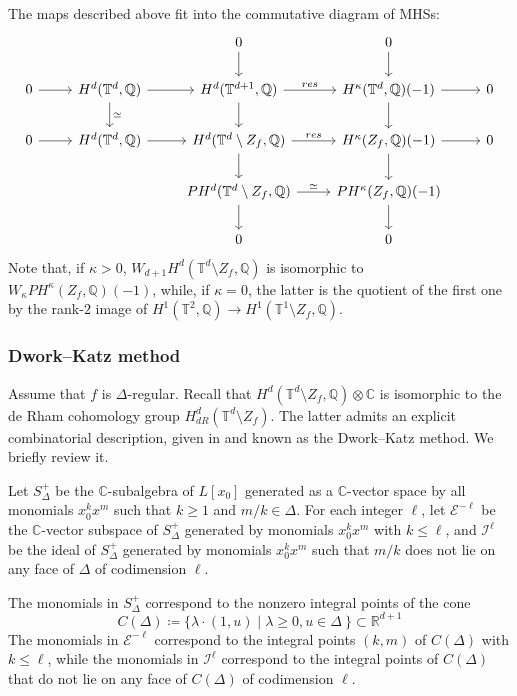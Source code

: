 \documentclass[11pt, reqno]{amsart}
\theoremstyle{plain}
\theoremstyle{definition}
\newcommand{\CC}{\mathbb{C}}
\newcommand{\QQ}{\mathbb{Q}}
\newcommand{\RR}{\mathbb{R}}
\newcommand{\TT}{\mathbb{T}}
\begin{document}
The maps described above fit into the commutative diagram of MHSs: 
\begin{equation}
    \label{eq:Z-Ztilde-diagram}
\begin{tikzcd}
 &  &  0 \arrow[d] & 0 \arrow[d]   & \\
 0 \arrow[r] & H^{d}(\TT^d, \QQ) \arrow[r] \arrow[d, "\simeq"] &  H^{d}(\TT^{d+1}, \QQ)  \arrow[r, "res"] \arrow[d] & H^\kappa(\TT^d, \QQ)(-1) \arrow[d]  \arrow{r} & 0 \\
0 \arrow[r] & H^{d}(\TT^d, \QQ) \arrow[r]  &  H^{d}(\TT^d \setminus Z_{f}, \QQ) \arrow[r, "res" ] \arrow[d] & H^{\kappa}( Z_{f}, \QQ)(-1) \arrow[d] \arrow{r} & 0 \\
&       &  PH^{d}(\TT^d \setminus Z_f, \QQ) \arrow[r, " \simeq "]      \arrow[d]      &  PH^{\kappa}(Z_f, \QQ)(-1) \arrow[d]    & \\
 &      & 0           & 0 & 
\end{tikzcd}
\end{equation}
Note that, if $\kappa>0$, 
$W_{d+1}H^d (\TT^d \setminus Z_f,\QQ)$ is isomorphic to $W_{\kappa}PH^\kappa (Z_f,\QQ)(-1)$,  while, if $\kappa=0$, the latter 
is the quotient of the first one by the rank-$2$ image of 
 $H^{1}(\TT^{2}, \QQ) \to H^1(\TT^1\setminus Z_f,\QQ)$.







\subsubsection*{Dwork--Katz method}
Assume that $f$ is $\Delta$-regular. 
Recall that $H^d(\TT^d \setminus Z_f, \QQ)\otimes \CC$ is isomorphic to the de Rham cohomology group $H^d_{dR}(\TT^d \setminus Z_f)$. 
The latter admits an explicit combinatorial description, given in \cite[Sections 7-8]{Batyrev-tori} and known as the Dwork--Katz method. 
We briefly review it. 

Let $S_\Delta^+$ be the $\CC$-subalgebra of $L[x_0]$ generated as a $\CC$-vector space by all monomials $x_0^kx^m$ such that  $k \ge 1$  and $m/k \in \Delta.$ 
For each integer $\ell$, let $\mathcal{E}^{-\ell}$ be the $\CC$-vector subspace of $S_\Delta^+$  generated by monomials $x_0^k x^m$ with $k\le \ell$, and $\mathcal{I}^{\ell}$ be the ideal of $S_\Delta^+$ generated by monomials $x_0^kx^m$ such that $m/k$ does not lie on any face of $\Delta$ of codimension $\ell$. 

The monomials in $S_{\Delta}^{+}$ correspond to the nonzero integral points of the cone
\[ C(\Delta) \coloneqq \{\lambda \cdot (1, u) \mid \lambda \geq 0, u \in \Delta\ \} \subset \RR^{d+1}
\] 
The monomials in $\mathcal{E}^{-\ell}$ correspond to the integral points $(k,m)$  of $C(\Delta)$ with $k \le \ell$, while the monomials in $\mathcal{I}^{\ell}$ correspond to the integral points of $C(\Delta)$ that do not lie on any face of $C(\Delta)$ of codimension $\ell$. 
\end{document}
